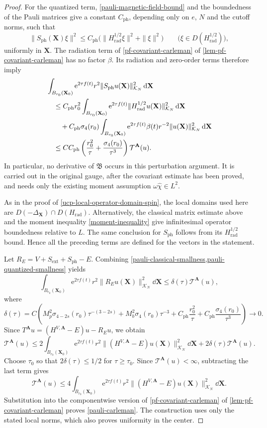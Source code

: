 \documentclass[final,reqno]{amsart}
\theoremstyle{remark}
\newcommand{\e}{\mathrm{e}}
\newcommand{\DC}{D}
\newcommand{\BF}{\bm{\mathfrak{B}}}
\newcommand{\rad}{\mathrm{rad}}
\newcommand{\vA}{{\mathbf{A}}}
\newcommand{\vX}{{\mathbf{X}}}
\newcommand{\wh}[1]{\widehat{#1}}
\begin{document}
\begin{proof}
For the quantized term, \cref{pauli-magnetic-field-bound} and the
boundedness of the Pauli matrices give a constant $C_{\mathrm{ph}}$, depending
only on $e$, $N$ and the cutoff norms, such that
\[
 \|S_{\mathrm{ph}}(\vX)\xi\|^2
 \leq C_{\mathrm{ph}}\big(\|H_\rad^{1/2}\xi\|^2+\|\xi\|^2\big)
 \qquad\big(\xi\in\DC(H_\rad^{1/2})\big),
\]
uniformly in $\vX$.  The radiation term of
\cref{pf-covariant-carleman} of \cref{lem-pf-covariant-carleman} has no factor $\beta$.
Its radiation and zero-order terms therefore imply
\begin{align}
 &\int_{B_{r_0}(\vX_0)}\e^{2\tau f(t)}r^2\|S_{\mathrm{ph}}u(\vX)\|_{\mathcal K_N}^2\dd\vX
       \notag\\
 &\quad\leq C_{\mathrm{ph}}r_0^2\int_{B_{r_0}(\vX_0)}\e^{2\tau f(t)}
                                  \|H_\rad^{1/2}u(\vX)\|_{\mathcal K_N}^2\dd\vX
       \notag\\
 &\qquad+C_{\mathrm{ph}}\sigma_4(r_0)\int_{B_{r_0}(\vX_0)}\e^{2\tau f(t)}
                                  \beta(t)r^{-2}\|u(\vX)\|_{\mathcal K_N}^2\dd\vX
       \notag\\
 &\quad\leq CC_{\mathrm{ph}}\left(\frac{r_0^2}{\tau}
                   +\frac{\sigma_4(r_0)}{\tau^3}\right)\mathcal T^{\vA}(u).
 \label{pauli-quantized-smallness}
\end{align}
In particular, no derivative of $\BF$ occurs in this perturbation
argument.  It is carried out in the original gauge, after the
covariant estimate has been proved, and needs only the existing
moment assumption $\omega\wh\chi\in L^2$.

As in the proof of \cref{ucp-local-operator-domain-spin}, the local
domains used here are $\DC(-\Delta_{\vX})\cap\DC(H_\rad)$.  Alternatively, the classical matrix
estimate above and the moment inequality \cref{moment-inequality}
give infinitesimal operator
boundedness relative to $L$.  The same conclusion for $S_{\mathrm{ph}}$
follows from its $H_\rad^{1/2}$ bound.  Hence all the preceding terms
are defined for the vectors in the statement.

Let $R_E=V+S_{\mathrm{ext}}+S_{\mathrm{ph}}-E$.  Combining
\cref{pauli-classical-smallness,pauli-quantized-smallness} yields
\[
 \int_{B_{r_0}(\vX_0)}\e^{2\tau f(t)}r^2\|R_Eu(\vX)\|_{\mathcal K_N}^2\dd\vX
 \leq\delta(\tau)\mathcal T^{\vA}(u),
\]
where
\[
 \delta(\tau)=C\left(
 M_p^2\sigma_{4-2s}(r_0)\tau^{-(3-2s)}
 +M_b^2\sigma_4(r_0)\tau^{-3}
 +C_{\mathrm{ph}}\frac{r_0^2}{\tau}
 +C_{\mathrm{ph}}\frac{\sigma_4(r_0)}{\tau^3}\right)
 \longrightarrow0.
\]
Since $T^{\vA}u=(H^{V,\vA}-E)u-R_Eu$, we obtain
\[
 \mathcal T^{\vA}(u)\leq2\int_{B_{r_0}(\vX_0)}\e^{2\tau f(t)}r^2
        \|(H^{V,\vA}-E)u(\vX)\|_{\mathcal K_N}^2\dd\vX+2\delta(\tau)\mathcal T^{\vA}(u).
\]
Choose $\tau_0$ so that $2\delta(\tau)\leq1/2$ for
$\tau\geq\tau_0$.  Since $\mathcal T^{\vA}(u)<\infty$, subtracting the
last term gives
\[
 \mathcal T^{\vA}(u)\leq4\int_{B_{r_0}(\vX_0)}\e^{2\tau f(t)}r^2
        \|(H^{V,\vA}-E)u(\vX)\|_{\mathcal K_N}^2\dd\vX.
\]
Substitution into the componentwise version of
\cref{pf-covariant-carleman} of \cref{lem-pf-covariant-carleman} proves \cref{pauli-carleman}.  The construction uses only the stated local norms,
which also proves uniformity in the center.
\end{proof}
\end{document}
